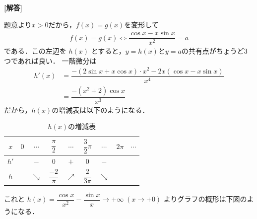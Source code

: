 \documentclass[../../main.tex]{subfiles}
\begin{document}
\begin{oframed}
  
\end{oframed}

{\bf [解答]}

題意より$x>0$だから，$f(x)=g(x)$を変形して
\begin{align}
  f(x) = g(x) \iff \dfrac{\cos x - x\sin x}{x^2} = a \label{eq:1}
\end{align}
である．この左辺を $h(x)$ とすると，$y=h(x)$と$y=a$の共有点がちょうど$3$つであれば良い．
一階微分は
\begin{align}
  h'(x) &= \dfrac{-(2\sin x + x\cos x) \cdot x^2 - 2x (\cos x - x\sin x)}{x^4} \\
  &= \dfrac{-(x^2 + 2)\cos x}{x^3}
\end{align}
だから，$h(x)$の増減表は以下のようになる．

\begin{table}[htb]
  \centering
  \caption{$h(x)$の増減表}
  \begin{tabular}{|c|c|c|c|c|c|c|c|c|}
    \hline
    $x$ & $0$ & $\cdots$ & $\dfrac{\pi}{2}$ & $\cdots$ & $\dfrac{3}{2}\pi$ & $\cdots$ & $2\pi$ & $\cdots$ \\ \hline
    $h'$ & & $-$ & $0$ & $+$ & $0$ & $-$ &  & \\ \hline
    $h$ & & $\searrow$ & $\dfrac{-2}{\pi}$ & $\nearrow$ & $\dfrac{2}{3\pi}$ & $\searrow$ & & \\ \hline
  \end{tabular}
\end{table}

これと $h(x) = \dfrac{\cos x}{x^2} - \dfrac{\sin x}{x} \to +\infty \; (x \to +0)$ よりグラフの概形は下図のようになる．
\end{document}
